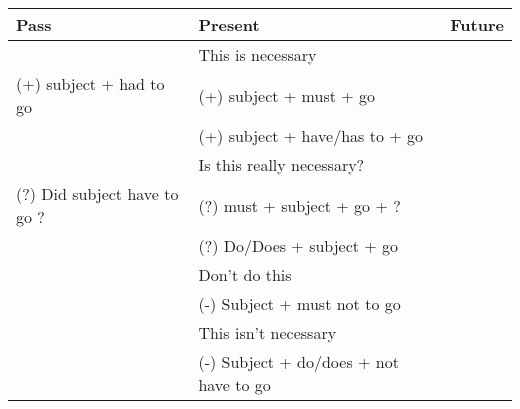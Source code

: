 \documentclass[a4paper]{article}
\begin{document}
{
    \fontsize{6pt}{6pt}\selectfont
    \begin{tabular}{|l|l|l|}
        \hline
        Pass & Present &  Future \\
        \hline
                                      & This is necessary              & \\ 
        (+) subject + had to go       & (+) subject + must + go        & \\ 
                                      & (+) subject + have/has to + go & \\
        \hline
                                      & Is this really necessary?   & \\
        (?) Did subject have to go ?  & (?) must + subject + go + ?     & \\
        & (?) Do/Does + subject + go  & \\
        \hline
        & Don't do this                          & \\
        & (-) Subject + must not to go           & \\
        & This isn't necessary                   & \\
        & (-) Subject + do/does + not have to go & \\   
        \hline

    \end{tabular}
}
\end{document}
